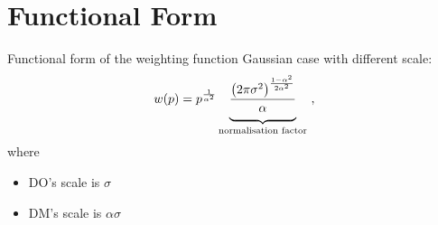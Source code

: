 \section{Functional Form}
\begin{frame}{Functional form of the weighting function}
Gaussian case with different scale:
\begin{equation}
	w(p) =
	p^{\frac{1}{\alpha^2}}
	\underbrace{
	\frac{\left(2\pi\sigma^2\right)^{\frac{1-\alpha^2}{2\alpha^2}}}{\alpha\strut}
	}_{\text{normalisation factor}}
	~,
\end{equation}
where
\begin{itemize}
  \item DO's scale is $\sigma$
  \item DM's scale is $\alpha\sigma$
\end{itemize}
\end{frame}




